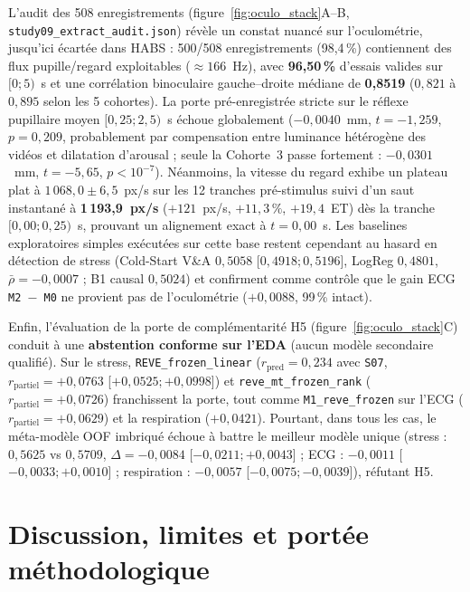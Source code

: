 \documentclass[10pt]{article}
\begin{document}
L'audit des 508 enregistrements (figure~\ref{fig:oculo_stack}A--B, \texttt{study09\_extract\_audit.json}) révèle un constat nuancé sur l'oculométrie, jusqu'ici écartée dans HABS : 500/508 enregistrements (98,4\,\%) contiennent des flux pupille/regard exploitables ($\approx 166$~Hz), avec \textbf{96,50\,\%} d'essais valides sur $[0 ; 5)$~s et une corrélation binoculaire gauche--droite médiane de \textbf{0,8519} ($0{,}821$ à $0{,}895$ selon les 5 cohortes). La porte pré-enregistrée stricte sur le réflexe pupillaire moyen $[0{,}25 ; 2{,}5)$~s échoue globalement ($-0{,}0040$~mm, $t = -1{,}259$, $p = 0{,}209$, probablement par compensation entre luminance hétérogène des vidéos et dilatation d'arousal ; seule la Cohorte~3 passe fortement : $-0{,}0301$~mm, $t = -5{,}65$, $p < 10^{-7}$). Néanmoins, la vitesse du regard exhibe un plateau plat à $1\,068{,}0 \pm 6{,}5$~px/s sur les 12 tranches pré-stimulus suivi d'un saut instantané à \textbf{1\,193,9~px/s} ($+121$~px/s, $+11{,}3\,\%$, $+19{,}4$~ET) dès la tranche $[0{,}00 ; 0{,}25)$~s, prouvant un alignement exact à $t = 0{,}00$~s. Les baselines exploratoires simples exécutées sur cette base restent cependant au hasard en détection de stress (Cold-Start V\&A $0{,}5058$ [$0{,}4918 ; 0{,}5196$], LogReg $0{,}4801$, $\bar{\rho} = -0{,}0007$ ; B1 causal $0{,}5024$) et confirment comme contrôle que le gain ECG \texttt{M2 $-$ M0} ne provient pas de l'oculométrie ($+0{,}0088$, 99\,\% intact).

Enfin, l'évaluation de la porte de complémentarité H5 (figure~\ref{fig:oculo_stack}C) conduit à une \textbf{abstention conforme sur l'EDA} (aucun modèle secondaire qualifié). Sur le stress, \texttt{REVE\_frozen\_linear} ($r_{\text{pred}} = 0{,}234$ avec \texttt{S07}, $r_{\text{partiel}} = +0{,}0763$ [$+0{,}0525 ; +0{,}0998$]) et \texttt{reve\_mt\_frozen\_rank} ($r_{\text{partiel}} = +0{,}0726$) franchissent la porte, tout comme \texttt{M1\_reve\_frozen} sur l'ECG ($r_{\text{partiel}} = +0{,}0629$) et la respiration ($+0{,}0421$). Pourtant, dans tous les cas, le méta-modèle OOF imbriqué échoue à battre le meilleur modèle unique (stress : $0{,}5625$ vs $0{,}5709$, $\Delta = -0{,}0084$ [$-0{,}0211 ; +0{,}0043$] ; ECG : $-0{,}0011$ [$-0{,}0033 ; +0{,}0010$] ; respiration : $-0{,}0057$ [$-0{,}0075 ; -0{,}0039$]), réfutant H5.

\section{Discussion, limites et portée méthodologique}
\end{document}
